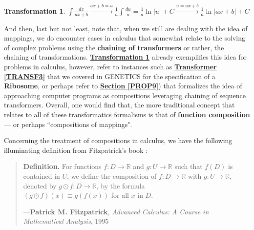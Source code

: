 \documentclass[a4paper, 18pt]{book} %
\newtheorem{trans}{Transformation}
\begin{document}
\begin{appendices}
\begin{trans}
\label{TRANSINTEGRAL}
$\int \frac{dx}{ax + b} \xrightarrow{ax + b=u} \frac{1}{a} \int \frac{du}{u} = \frac{1}{a} \ln |u| + C   \xrightarrow{u=ax + b}  \frac{1}{a} \ln |ax + b| + C$
\end{trans}


\vspace{2em}



And then, last but not least, note that, when we still are dealing with the idea of mappings, we do encounter cases in calculus that somewhat relate to the solving of complex problems using the \textbf{chaining of transformers} or rather, the chaining of transformations. \textbf{\hyperref[TRANSINTEGRAL]{Transformation \ref{TRANSINTEGRAL}}} already exemplifies this idea for problems in calculus, however, refer to instances such as \textbf{\hyperref[TRANSF3]{Transformer \ref{TRANSF3}}} that we covered in GENETICS for the specification of a \textbf{Ribosome}, or perhaps refer to \textbf{\hyperref[PROP9]{Section \ref{PROP9}}}) that formalizes the idea of approaching computer programs as compositions leveraging chaining of sequence transformers. Overall, one would find that, the more traditional concept that relates to all of these transformatics formalisms is that of \textbf{function composition} --- or perhaps ``compositions of mappings".

\vspace{2em}

Concerning the treatment of compositions in calculus, we have the following illuminating definition from Fitzpatrick's book \cite{fitzpatrick1995advanced}:



\noindent
\begin{minipage}{1\textwidth}
\vspace{1em}
\begin{quotation}
{\ttfamily

\textbf{Definition.} For functions $f:D \rightarrow \mathbb{R}$ and $g:U \rightarrow \mathbb{R}$ such that $f(D)$ is contained in $U$, we define the composition of $f:D \rightarrow \mathbb{R}$ with $g:U \rightarrow \mathbb{R}$, denoted by $g \odot f:D \rightarrow \mathbb{R}$, by the formula\\

$(g \odot f)(x) \equiv g(f(x))$ for all $x$ in $D$. 

}
\hspace*{\fill} ---\textbf{Patrick M. Fitzpatrick}, \textit{Advanced Calculus: A Course in Mathematical Analysis}, 1995\cite{fitzpatrick1995advanced}
\end{quotation}
\vspace{1em}
\end{minipage}


\end{appendices}
\end{document}
